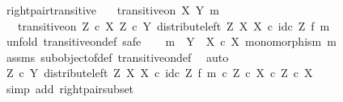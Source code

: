 \begin{isabellebody}
{\isafoldproof}%
%
\isadelimproof
\isanewline
%
\endisadelimproof
\isanewline
{}\isamarkupfalse%
\ right{\isacharunderscore}{\kern0pt}pair{\isacharunderscore}{\kern0pt}transitive{\isacharcolon}{\kern0pt}\isanewline
\ \ \ {\isachardoublequoteopen}transitive{\isacharunderscore}{\kern0pt}on\ X\ {\isacharparenleft}{\kern0pt}Y{\isacharcomma}{\kern0pt}\ m{\isacharparenright}{\kern0pt}{\isachardoublequoteclose}\isanewline
\ \ \ {\isachardoublequoteopen}transitive{\isacharunderscore}{\kern0pt}on\ {\isacharparenleft}{\kern0pt}Z\ {\isasymtimes}\isactrlsub c\ X{\isacharparenright}{\kern0pt}\ {\isacharparenleft}{\kern0pt}Z\ {\isasymtimes}\isactrlsub c\ Y{\isacharcomma}{\kern0pt}\ distribute{\isacharunderscore}{\kern0pt}left\ Z\ X\ X\ {\isasymcirc}\isactrlsub c\ {\isacharparenleft}{\kern0pt}id\isactrlsub c\ Z\ {\isasymtimes}\isactrlsub f\ m{\isacharparenright}{\kern0pt}{\isacharparenright}{\kern0pt}{\isachardoublequoteclose}\isanewline
%
\isadelimproof
%
\endisadelimproof
%
\isatagproof
{}\isamarkupfalse%
\ {\isacharparenleft}{\kern0pt}unfold\ transitive{\isacharunderscore}{\kern0pt}on{\isacharunderscore}{\kern0pt}def{\isacharcomma}{\kern0pt}\ safe{\isacharparenright}{\kern0pt}\isanewline
\ \ \isamarkupfalse%
\ {\isachardoublequoteopen}m\ {\isacharcolon}{\kern0pt}\ Y\ {\isasymrightarrow}\ X\ {\isasymtimes}\isactrlsub c\ X{\isachardoublequoteclose}\ {\isachardoublequoteopen}monomorphism\ m{\isachardoublequoteclose}\isanewline
\ \ \ \ \isamarkupfalse%
\ assms\ subobject{\isacharunderscore}{\kern0pt}of{\isacharunderscore}{\kern0pt}def{}\ transitive{\isacharunderscore}{\kern0pt}on{\isacharunderscore}{\kern0pt}def\ \isamarkupfalse%
\ auto\isanewline
\ \ \isamarkupfalse%
\ \isamarkupfalse%
\ {\isachardoublequoteopen}{\isacharparenleft}{\kern0pt}Z\ {\isasymtimes}\isactrlsub c\ Y{\isacharcomma}{\kern0pt}\ distribute{\isacharunderscore}{\kern0pt}left\ Z\ X\ X\ {\isasymcirc}\isactrlsub c\ id\isactrlsub c\ Z\ {\isasymtimes}\isactrlsub f\ m{\isacharparenright}{\kern0pt}\ {\isasymsubseteq}\isactrlsub c\ {\isacharparenleft}{\kern0pt}Z\ {\isasymtimes}\isactrlsub c\ X{\isacharparenright}{\kern0pt}\ {\isasymtimes}\isactrlsub c\ Z\ {\isasymtimes}\isactrlsub c\ X{\isachardoublequoteclose}\isanewline
\ \ \ \ \isamarkupfalse%
\ {\isacharparenleft}{\kern0pt}simp\ add{\isacharcolon}{\kern0pt}\ right{\isacharunderscore}{\kern0pt}pair{\isacharunderscore}{\kern0pt}subset{\isacharparenright}{\kern0pt}\isanewline
{}\isamarkupfalse%

\end{isabellebody}
